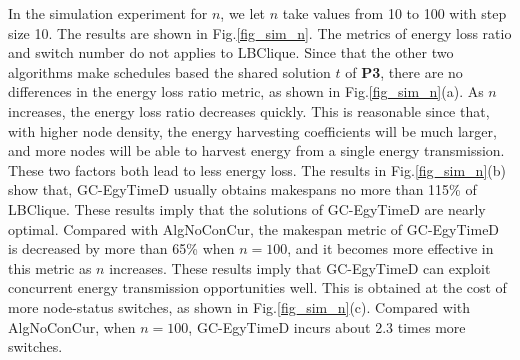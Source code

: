 \documentclass[journal,10pt]{IEEEtran}
\begin{document}
In the simulation experiment for $n$, we let $n$ take values from 10 to 100 with step size 10. The results are shown in Fig.\ref{fig_sim_n}. The metrics of energy loss ratio and switch number do not applies to LBClique. Since that the other two algorithms make schedules based the shared solution $t$ of \textbf{P3}, there are no differences in the energy loss ratio metric, as shown in Fig.\ref{fig_sim_n}(a). As $n$ increases, the energy loss ratio decreases quickly. This is reasonable since that, with higher node density, the energy harvesting coefficients will be much larger, and more nodes will be able to harvest energy from a single energy transmission. These two factors both lead to less energy loss. The results in Fig.\ref{fig_sim_n}(b) show that, GC-EgyTimeD usually obtains makespans no more than 115\% of LBClique. These results imply that the solutions of GC-EgyTimeD are nearly optimal. Compared with AlgNoConCur, the makespan metric of GC-EgyTimeD is decreased by more than 65\% when $n{=}100$, and it becomes more effective in this metric as $n$ increases. These results imply that GC-EgyTimeD can exploit concurrent energy transmission opportunities well. This is obtained at the cost of more node-status switches, as shown in Fig.\ref{fig_sim_n}(c). Compared with AlgNoConCur, when $n{=}100$, GC-EgyTimeD incurs about 2.3 times more switches.
\end{document}

